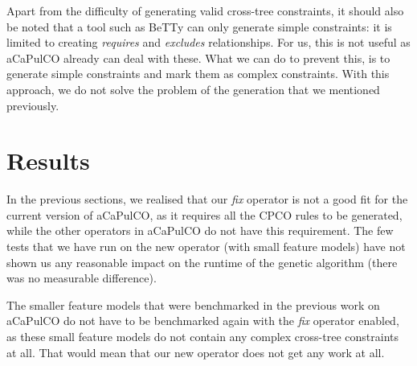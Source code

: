 Apart from the difficulty of generating valid cross-tree constraints, it should
also be noted that a tool such as BeTTy can only generate simple constraints: it
is limited to creating \emph{requires} and \emph{excludes} relationships. For us,
this is not useful as aCaPulCO already can deal with these.
What we can do to prevent this, is to generate simple constraints and mark them
as complex constraints. With this approach, we do not solve the problem of the
generation that we mentioned previously.

\section{Results}\label{sec:results}
In the previous sections, we realised that our \emph{fix} operator is not a good
fit for the current version of aCaPulCO, as it requires all the CPCO rules to be
generated, while the other operators in aCaPulCO do not have this requirement.
The few tests that we have run on the new operator (with small feature models)
have not shown us any reasonable impact on the runtime of the genetic algorithm
(there was no measurable difference).

The smaller feature models that were benchmarked in the previous work on aCaPulCO
do not have to be benchmarked again with the \emph{fix} operator enabled, as these
small feature models do not contain any complex cross-tree constraints at all. That
would mean that our new operator does not get any work at all.
